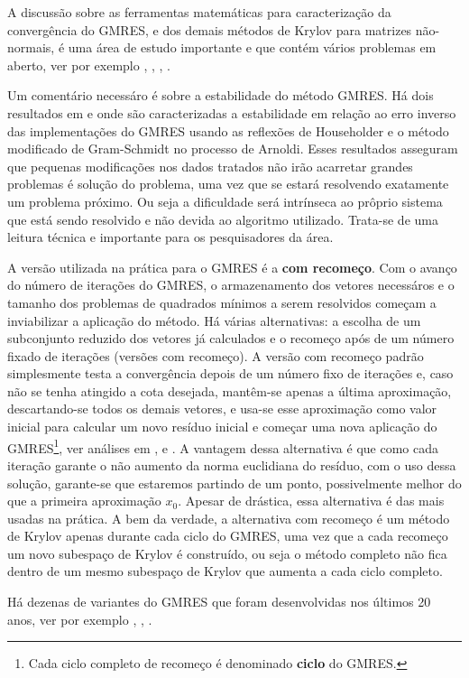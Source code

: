  A discussão  sobre as ferramentas matemáticas para caracterização da convergência do GMRES, e dos demais  métodos de Krylov para matrizes não-normais, é uma área de estudo importante e que contém vários problemas em aberto, ver por exemplo \cite{Embree1999How},  \cite{PaigeParlettEtAl95Approximate}, \cite{SimonciniSzyld2007Recent}, \cite{Zemke2003Krylov}.

 Um comentário necessáro  é sobre a estabilidade do método GMRES. Há dois resultados em \cite{PaigeRozloznikEtAl2006MODIFIED} e \cite{Rozloznik1997Numerical} onde são  caracterizadas a estabilidade em relação ao erro inverso das implementações do GMRES usando as reflexões de Householder e o método modificado de Gram-Schmidt no processo de Arnoldi. Esses resultados asseguram que pequenas modificações nos dados tratados não irão acarretar grandes problemas é solução do problema, uma vez que se estará  resolvendo exatamente um problema próximo. Ou seja a dificuldade será  intrínseca ao prôprio sistema que está sendo resolvido e não devida ao algoritmo utilizado. Trata-se de uma leitura  técnica e importante para os pesquisadores da área.



A versão  utilizada na prática para o GMRES é a \textbf{com recomeço}. Com o avanço do número de iterações do GMRES, o armazenamento dos vetores necessáros e o tamanho dos problemas de quadrados mínimos a serem resolvidos começam a inviabilizar a aplicação do  método. Há várias alternativas: a escolha de um subconjunto reduzido dos vetores já  calculados  e o recomeço após de um número fixado de iterações (versões com recomeço). A versão  com recomeço padrão simplesmente testa a convergência depois de um número fixo de iterações  e, caso não se tenha atingido a cota desejada, mantêm-se apenas a  última  aproximação, descartando-se todos os demais vetores,  e usa-se esse aproximação como valor inicial para calcular um novo  resíduo inicial e  começar uma nova aplicação do GMRES\footnote{Cada ciclo completo de recomeço é denominado \textbf{ciclo} do GMRES.}, ver análises em \cite{Morgan95Restarted}, \cite{Simoncini00Convergence} e \cite{Trefethen1990Algorithms}. A vantagem dessa alternativa é que como cada iteração garante o não aumento da norma euclidiana do  resíduo, com o uso dessa solução, garante-se que estaremos partindo de um ponto, possivelmente melhor do que a primeira aproximação $x_0$. Apesar de  drástica, essa alternativa é das mais usadas na prática. A bem da verdade, a alternativa com recomeço é um método de Krylov apenas durante cada ciclo do GMRES, uma vez que a cada recomeço um novo subespaço de Krylov é construído, ou seja o método completo não fica dentro de um mesmo subespaço de Krylov que aumenta a cada ciclo completo.

Há dezenas de variantes do  GMRES que foram desenvolvidas nos últimos 20 anos, ver por exemplo \cite{SaadVorst00Iterative}, \cite{SimonciniSzyld2007Recent}, \cite{Zou2023}.

